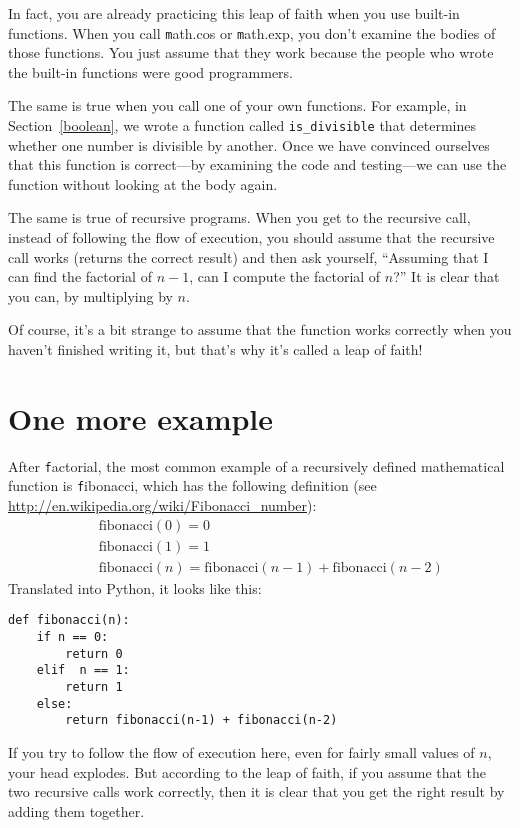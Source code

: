 \documentclass[
DIV=11,
fontsize=13,
twoside,
headinclude=false,
titlepage=firstiscover,
abstract=true,
headsepline=true,
footsepline=true,
chapterprefix=true, %
headings=big,
bibliography=totoc,%
captions=tableheading
]{scrbook}
\theoremstyle{definition}
\begin{document}
In fact, you are already practicing this leap of faith when you use
built-in functions.  When you call {\texttt math.cos} or {\texttt math.exp},
you don't examine the bodies of those functions.  You just
assume that they work because the people who wrote the built-in
functions were good programmers.

The same is true when you call one of your own functions.  For
example, in Section~\ref{boolean}, we wrote a function called 
\verb"is_divisible" that determines whether one number is divisible by
another.  Once we have convinced ourselves that this function is
correct---by examining the code and testing---we can use the function
without looking at the body again.

The same is true of recursive programs.  When you get to the recursive
call, instead of following the flow of execution, you should assume
that the recursive call works (returns the correct result) and then ask
yourself, ``Assuming that I can find the factorial of $n-1$, can I
compute the factorial of $n$?''  It is clear that you
can, by multiplying by $n$.

Of course, it's a bit strange to assume that the function works
correctly when you haven't finished writing it, but that's why
it's called a leap of faith!


\section{One more example}
\label{one.more.example}

After {\texttt factorial}, the most common example of a recursively
defined mathematical function is {\texttt fibonacci}, which has the
following definition (see
  \url{http://en.wikipedia.org/wiki/Fibonacci_number}):
%
\begin{eqnarray*}
&& \mathrm{fibonacci}(0) = 0 \\
&& \mathrm{fibonacci}(1) = 1 \\
&& \mathrm{fibonacci}(n) = \mathrm{fibonacci}(n-1) + \mathrm{fibonacci}(n-2)
\end{eqnarray*}
%
Translated into Python, it looks like this:

\begin{lstlisting}
def fibonacci(n):
    if n == 0:
        return 0
    elif  n == 1:
        return 1
    else:
        return fibonacci(n-1) + fibonacci(n-2)
\end{lstlisting}
%
If you try to follow the flow of execution here, even for fairly
small values of $n$, your head explodes.  But according to the
leap of faith, if you assume that the two recursive calls
work correctly, then it is clear that you get
the right result by adding them together.
\end{document}
